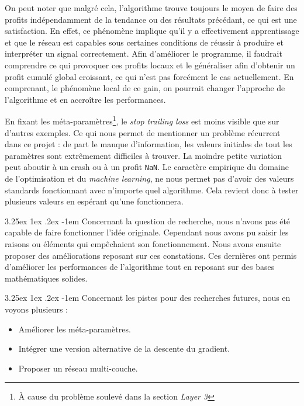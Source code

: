 \documentclass[a4paper, 11pt]{article}
\makeatletter
\renewcommand\paragraph{\@startsection{paragraph}{5}{\z@}%
  {3.25ex \@plus1ex \@minus.2ex}%
  {-1em}%
  {\normalfont\normalsize\bfseries}}
\makeatother
\begin{document}
On peut noter que malgré cela, l'algorithme trouve toujours le moyen de faire des profits indépendamment de la tendance ou des résultats précédant, ce
qui est une satisfaction. En effet, ce phénomène implique qu'il y a effectivement apprentissage et que le réseau est capables sous certaines conditions
de réussir à produire et interpréter un signal correctement. Afin
d'améliorer le programme, il faudrait comprendre ce qui provoquer ces profits locaux et le généraliser afin d'obtenir un profit cumulé global croissant, ce qui
n'est pas forcément le cas actuellement. En comprenant, le phénomène local de ce gain, on pourrait changer l'approche de l'algorithme et en accroître les
performances.

En fixant les méta-paramètres\footnote{À cause du problème soulevé dans la section \textit{Layer 3}}, le \textit{stop trailing loss} est moins visible
que sur d'autres exemples. Ce qui nous permet de mentionner un problème récurrent dans ce projet : de part le manque d'information, les valeurs initiales
de tout les paramètres sont extrêmement difficiles à trouver. La moindre petite variation peut aboutir à un crash ou à un profit \texttt{NaN}. Le caractère
empirique du domaine de l'optimisation et du \textit{machine learning}, ne nous permet pas d'avoir des valeurs standards fonctionnant avec n'importe quel
algorithme. Cela revient donc à tester plusieurs valeurs en espérant qu'une fonctionnera.

\paragraph{}
Concernant la question de recherche, nous n'avons pas été capable de faire fonctionner l'idée originale. Cependant nous avons pu saisir les raisons ou 
éléments qui empêchaient son fonctionnement. Nous avons ensuite proposer des améliorations reposant sur ces constations. Ces dernières ont permis 
d'améliorer les performances de l'algorithme tout en reposant sur des bases mathématiques solides.

\paragraph{}
Concernant les pistes pour des recherches futures, nous en voyons plusieurs :
\begin{itemize}
 \item Améliorer les méta-paramètres.
 \item Intégrer une version alternative de la descente du gradient.
 \item Proposer un réseau multi-couche.
\end{itemize}
\end{document}
